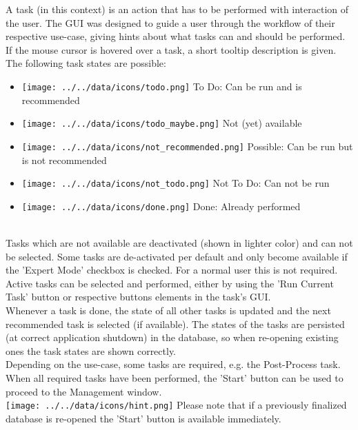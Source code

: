 A task (in this context) is an action that has to be performed with interaction of the user. The GUI was designed to guide a user through the workflow of their respective use-case, giving hints about what tasks can and should be performed. \\

If the mouse cursor is hovered over a task, a short tooltip description is given. \\

The following task states are possible:

\begin{itemize}
 \item \texttt{[image: ../../data/icons/todo.png]} To Do: Can be run and is recommended
 \item \texttt{[image: ../../data/icons/todo\_maybe.png]} Not (yet) available
 \item \texttt{[image: ../../data/icons/not\_recommended.png]} Possible: Can be run but is not recommended
 \item \texttt{[image: ../../data/icons/not\_todo.png]} Not To Do: Can not be run
 \item \texttt{[image: ../../data/icons/done.png]} Done: Already performed
\end{itemize}
\  \\

Tasks which are not available are deactivated (shown in lighter color) and can not be selected. Some tasks are de-activated per default and only become available if the 'Expert Mode' checkbox is checked. For a normal user this is not required.\\

Active tasks can be selected and performed, either by using the 'Run Current Task' button or respective buttons elements in the task's GUI. \\

Whenever a task is done, the state of all other tasks is updated and the next recommended task is selected (if available). The states of the tasks are persisted (at correct application shutdown) in the database, so when re-opening existing ones the task states are shown correctly. \\

Depending on the use-case, some tasks are required, e.g. the Post-Process task. When all required tasks have been performed, the 'Start' button can be used to proceed to the Management window. \\

\texttt{[image: ../../data/icons/hint.png]} Please note that if a previously finalized database is re-opened the 'Start' button is available immediately.


